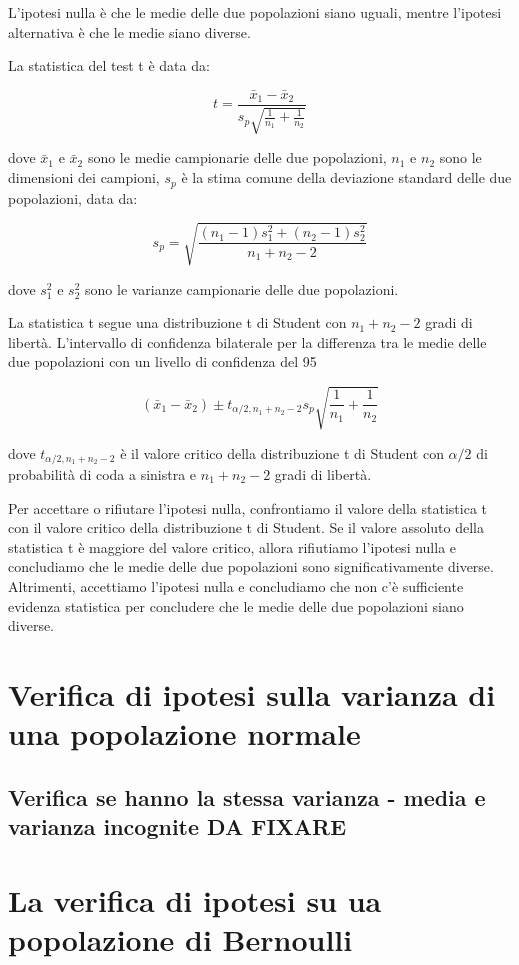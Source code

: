 L'ipotesi nulla è che le medie delle due popolazioni siano uguali, mentre l'ipotesi alternativa è che le medie siano diverse.

La statistica del test t è data da:

$$
t = \frac{\bar{x}_1 - \bar{x}_2}{s_{p}\sqrt{\frac{1}{n_1}+\frac{1}{n_2}}}
$$

dove $\bar{x}_1$ e $\bar{x}_2$ sono le medie campionarie delle due popolazioni, $n_1$ e $n_2$ sono le dimensioni dei campioni, $s_{p}$ è la stima comune della deviazione standard delle due popolazioni, data da:

$$
s_{p}=\sqrt{\frac{(n_1-1)s_1^2+(n_2-1)s_2^2}{n_1+n_2-2}}
$$

dove $s_1^2$ e $s_2^2$ sono le varianze campionarie delle due popolazioni.

La statistica t segue una distribuzione t di Student con $n_1+n_2-2$ gradi di libertà. L'intervallo di confidenza bilaterale per la differenza tra le medie delle due popolazioni con un livello di confidenza del 95%

$$
(\bar{x}_1 - \bar{x}_2) \pm t_{\alpha/2,n_1+n_2-2}s_p \sqrt{\frac{1}{n_1}+\frac{1}{n_2}}
$$

dove $t_{\alpha/2,n_1+n_2-2}$ è il valore critico della distribuzione t di Student con $\alpha/2$ di probabilità di coda a sinistra e $n_1+n_2-2$ gradi di libertà.

Per accettare o rifiutare l'ipotesi nulla, confrontiamo il valore della statistica t con il valore critico della distribuzione t di Student. Se il valore assoluto della statistica t è maggiore del valore critico, allora rifiutiamo l'ipotesi nulla e concludiamo che le medie delle due popolazioni sono significativamente diverse. Altrimenti, accettiamo l'ipotesi nulla e concludiamo che non c'è sufficiente evidenza statistica per concludere che le medie delle due popolazioni siano diverse.


\section{Verifica di ipotesi sulla varianza di una popolazione normale}

\subsection{Verifica se hanno la stessa varianza - media e varianza incognite DA FIXARE}

\section{La verifica di ipotesi su ua popolazione di Bernoulli}






